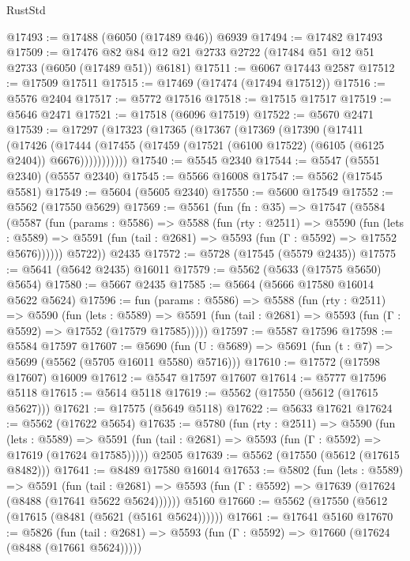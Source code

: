 \begin{lexlean}{RustStd}
\begin{coremodule}
@17493 := @17488 (@6050 (@17489 @46)) @6939
@17494 := @17482 @17493
@17509 := @17476 @82 @84 @12 @21 @2733 @2722 (@17484 @51 @12 @51 @2733 (@6050 (@17489 @51)) @6181)
@17511 := @6067 @17443 @2587
@17512 := @17509 @17511
@17515 := @17469 (@17474 (@17494 @17512))
@17516 := @5576 @2404
@17517 := @5772 @17516
@17518 := @17515 @17517
@17519 := @5646 @2471
@17521 := @17518 (@6096 @17519)
@17522 := @5670 @2471
@17539 := @17297
    (@17323
      (@17365
        (@17367
          (@17369
            (@17390
              (@17411
                (@17426
                  (@17444
                    (@17455 (@17459 (@17521 (@6100 @17522) (@6105 (@6125 @2404)) @6676)))))))))))
@17540 := @5545 @2340
@17544 := @5547 (@5551 @2340) (@5557 @2340)
@17545 := @5566 @16008
@17547 := @5562 (@17545 @5581)
@17549 := @5604 (@5605 @2340)
@17550 := @5600 @17549
@17552 := @5562 (@17550 @5629)
@17569 := @5561
    (fun (fn : @35) =>
    @17547
      (@5584
        (@5587
          (fun (params : @5586) =>
          @5588
            (fun (rty : @2511) =>
            @5590
              (fun (lets : @5589) =>
              @5591 (fun (tail : @2681) => @5593 (fun (Γ : @5592) => @17552 @5676))))))
        @5722))
    @2435
@17572 := @5728 (@17545 (@5579 @2435))
@17575 := @5641 (@5642 @2435) @16011
@17579 := @5562 (@5633 (@17575 @5650) @5654)
@17580 := @5667 @2435
@17585 := @5664 (@5666 @17580 @16014 @5622 @5624)
@17596 := fun (params : @5586) =>
  @5588
    (fun (rty : @2511) =>
    @5590
      (fun (lets : @5589) =>
      @5591 (fun (tail : @2681) => @5593 (fun (Γ : @5592) => @17552 (@17579 @17585)))))
@17597 := @5587 @17596
@17598 := @5584 @17597
@17607 := @5690
    (fun (U : @5689) => @5691 (fun (t : @7) => @5699 (@5562 (@5705 @16011 @5580) @5716)))
@17610 := @17572 (@17598 @17607) @16009
@17612 := @5547 @17597 @17607
@17614 := @5777 @17596 @5118
@17615 := @5614 @5118
@17619 := @5562 (@17550 (@5612 (@17615 @5627)))
@17621 := @17575 (@5649 @5118)
@17622 := @5633 @17621
@17624 := @5562 (@17622 @5654)
@17635 := @5780
    (fun (rty : @2511) =>
    @5590
      (fun (lets : @5589) =>
      @5591 (fun (tail : @2681) => @5593 (fun (Γ : @5592) => @17619 (@17624 @17585)))))
    @2505
@17639 := @5562 (@17550 (@5612 (@17615 @8482)))
@17641 := @8489 @17580 @16014
@17653 := @5802
    (fun (lets : @5589) =>
    @5591
      (fun (tail : @2681) =>
      @5593 (fun (Γ : @5592) => @17639 (@17624 (@8488 (@17641 @5622 @5624))))))
    @5160
@17660 := @5562 (@17550 (@5612 (@17615 (@8481 (@5621 (@5161 @5624))))))
@17661 := @17641 @5160
@17670 := @5826
    (fun (tail : @2681) => @5593 (fun (Γ : @5592) => @17660 (@17624 (@8488 (@17661 @5624)))))

\end{coremodule}
\end{lexlean}
